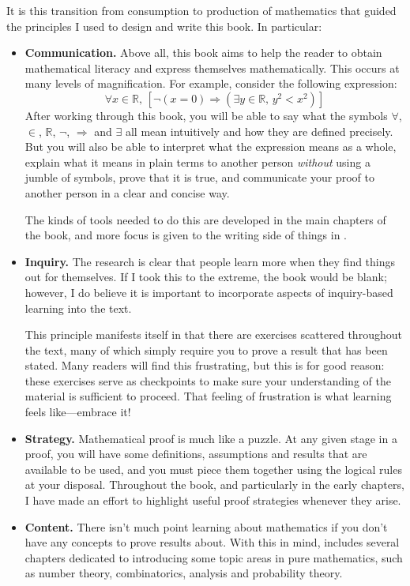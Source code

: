 It is this transition from consumption to production of mathematics that guided the principles I used to design and write this book. In particular:
\begin{itemize}
\item \textbf{Communication.} Above all, this book aims to help the reader to obtain mathematical literacy and express themselves mathematically. This occurs at many levels of magnification. For example, consider the following expression:
\[ \forall x \in \mathbb{R},\, [\neg(x = 0) \Rightarrow (\exists y \in \mathbb{R},\, y^2 < x^2)] \]
After working through this book, you will be able to say what the symbols $\forall$, $\in$, $\mathbb{R}$, $\neg$, $\Rightarrow$ and $\exists$ all mean intuitively and how they are defined precisely. But you will also be able to interpret what the expression means as a whole, explain what it means in plain terms to another person \textit{without} using a jumble of symbols, prove that it is true, and communicate your proof to another person in a clear and concise way.

The kinds of tools needed to do this are developed in the main chapters of the book, and more focus is given to the writing side of things in .

\item \textbf{Inquiry.} The research is clear that people learn more when they find things out for themselves. If I took this to the extreme, the book would be blank; however, I do believe it is important to incorporate aspects of inquiry-based learning into the text.

This principle manifests itself in that there are exercises scattered throughout the text, many of which simply require you to prove a result that has been stated. Many readers will find this frustrating, but this is for good reason: these exercises serve as checkpoints to make sure your understanding of the material is sufficient to proceed. That feeling of frustration is what learning feels like---embrace it!

\item \textbf{Strategy.} Mathematical proof is much like a puzzle. At any given stage in a proof, you will have some definitions, assumptions and results that are available to be used, and you must piece them together using the logical rules at your disposal. Throughout the book, and particularly in the early chapters, I have made an effort to highlight useful proof strategies whenever they arise.

\item \textbf{Content.} There isn't much point learning about mathematics if you don't have any concepts to prove results about. With this in mind,  includes several chapters dedicated to introducing some topic areas in pure mathematics, such as number theory, combinatorics, analysis and probability theory.


\end{itemize}
